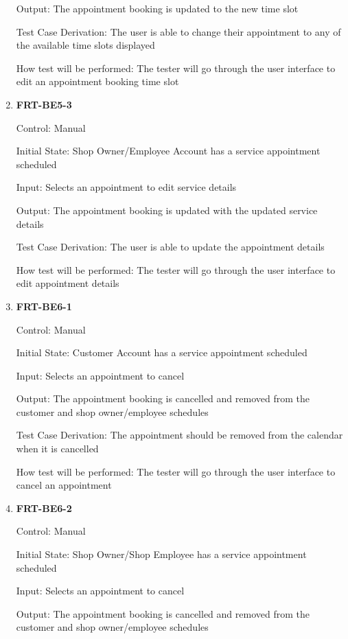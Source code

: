 \documentclass[12pt, titlepage]{article}
\begin{document}
\begin{enumerate}
	      Output: The appointment booking is updated to the new time slot

	      Test Case Derivation: The user is able to change their appointment to any of the available time
	      slots displayed

	      How test will be performed: The tester will go through the user interface to edit an appointment
	      booking time slot

	\item \textbf{FRT-BE5-3}

	      Control: Manual

	      Initial State: Shop Owner/Employee Account has a service appointment scheduled

	      Input: Selects an appointment to edit service details

	      Output: The appointment booking is updated with the updated service details

	      Test Case Derivation: The user is able to update the appointment details

	      How test will be performed: The tester will go through the user interface to edit appointment
	      details

	\item \textbf{FRT-BE6-1}

	      Control: Manual

	      Initial State: Customer Account has a service appointment scheduled

	      Input: Selects an appointment to cancel

	      Output: The appointment booking is cancelled and removed from the customer and shop owner/employee
	      schedules

	      Test Case Derivation: The appointment should be removed from the calendar when it is cancelled

	      How test will be performed: The tester will go through the user interface to cancel an appointment

	\item \textbf{FRT-BE6-2}

	      Control: Manual

	      Initial State: Shop Owner/Shop Employee has a service appointment scheduled

	      Input: Selects an appointment to cancel

	      Output: The appointment booking is cancelled and removed from the customer and shop owner/employee
	      schedules


\end{enumerate}
\end{document}
